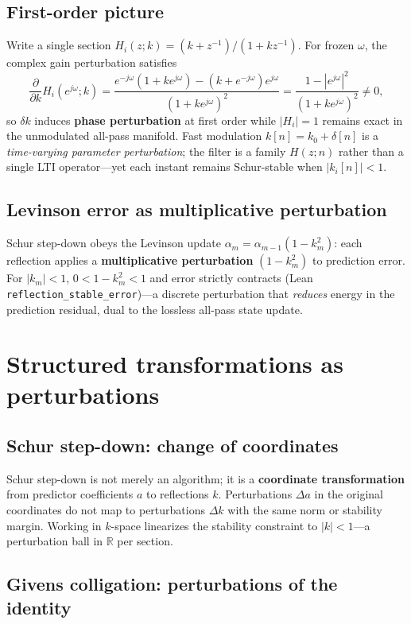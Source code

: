 \documentclass[11pt]{article}
\begin{document}
\subsection{First-order picture}

Write a single section $H_i(z;k)= (k+z^{-1})/(1+kz^{-1})$. For frozen $\omega$, the complex gain perturbation satisfies
\[
\frac{\partial}{\partial k} H_i(e^{j\omega};k)
= \frac{e^{-j\omega}(1+k e^{j\omega}) - (k+e^{-j\omega})e^{j\omega}}{(1+k e^{j\omega})^2}
= \frac{1-|e^{j\omega}|^2}{(1+k e^{j\omega})^2}\neq 0,
\]
so $\delta k$ induces \textbf{phase perturbation} at first order while $|H_i|=1$ remains exact in the unmodulated all-pass manifold. Fast modulation $k[n]=k_0+\delta[n]$ is a \emph{time-varying parameter perturbation}; the filter is a family $H(z;n)$ rather than a single LTI operator---yet each instant remains Schur-stable when $|k_i[n]|<1$.

\subsection{Levinson error as multiplicative perturbation}

Schur step-down obeys the Levinson update $\alpha_m=\alpha_{m-1}(1-k_m^2)$: each reflection applies a \textbf{multiplicative perturbation} $(1-k_m^2)$ to prediction error. For $|k_m|<1$, $0<1-k_m^2<1$ and error strictly contracts (Lean \texttt{reflection\_stable\_error})---a discrete perturbation that \emph{reduces} energy in the prediction residual, dual to the lossless all-pass state update.

\section{Structured transformations as perturbations}

\subsection{Schur step-down: change of coordinates}

Schur step-down is not merely an algorithm; it is a \textbf{coordinate transformation} from predictor coefficients $a$ to reflections $k$. Perturbations $\Delta a$ in the original coordinates do not map to perturbations $\Delta k$ with the same norm or stability margin. Working in $k$-space linearizes the stability constraint to $|k|<1$---a perturbation ball in $\mathbb{R}$ per section.

\subsection{Givens colligation: perturbations of the identity}
\end{document}
